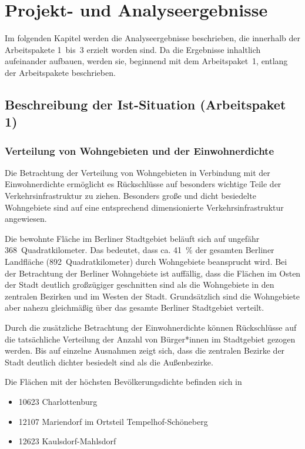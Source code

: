 \newpage
\section{Projekt- und Analyseergebnisse}
\label{projekt_und_analyseergebnisse}

Im folgenden Kapitel werden die Analyseergebnisse beschrieben, die innerhalb der Arbeitspakete 1~bis~3 erzielt worden sind. Da die Ergebnisse inhaltlich aufeinander aufbauen, werden sie, beginnend mit dem Arbeitspaket~1, entlang der Arbeitspakete beschrieben.

\subsection{Beschreibung der Ist-Situation (Arbeitspaket 1)}
\label{beschreibung_der_ist_situation_arbeitspaket_1}

\subsubsection{Verteilung von Wohngebieten und der Einwohnerdichte}

Die Betrachtung der Verteilung von Wohngebieten in Verbindung mit der Einwohnerdichte ermöglicht es Rückschlüsse auf besonders wichtige Teile der Verkehrsinfrastruktur zu ziehen. Besonders große und dicht besiedelte Wohngebiete sind auf eine entsprechend dimensionierte Verkehrsinfrastruktur angewiesen.

Die bewohnte Fläche im Berliner Stadtgebiet beläuft sich auf ungefähr 368~Quadratkilometer. Das bedeutet, dass ca. 41~\% der gesamten Berliner Landfläche (892~Quadratkilometer) durch Wohngebiete beansprucht wird. Bei der Betrachtung der Berliner Wohngebiete ist auffällig, dass die Flächen im Osten der Stadt deutlich großzügiger geschnitten sind als die Wohngebiete in den zentralen Bezirken und im Westen der Stadt. Grundsätzlich sind die Wohngebiete aber nahezu gleichmäßig über das gesamte Berliner Stadtgebiet verteilt.

Durch die zusätzliche Betrachtung der Einwohnerdichte können Rückschlüsse auf die tatsächliche Verteilung der Anzahl von Bürger*innen im Stadtgebiet gezogen werden. Bis auf einzelne Ausnahmen zeigt sich, dass die zentralen Bezirke der Stadt deutlich dichter besiedelt sind als die Außenbezirke.

Die Flächen mit der höchsten Bevölkerungsdichte befinden sich in

\begin{itemize}
    \item 10623 Charlottenburg
    \item 12107 Mariendorf im Ortsteil Tempelhof-Schöneberg
    \item 12623 Kaulsdorf-Mahlsdorf
\end{itemize}

